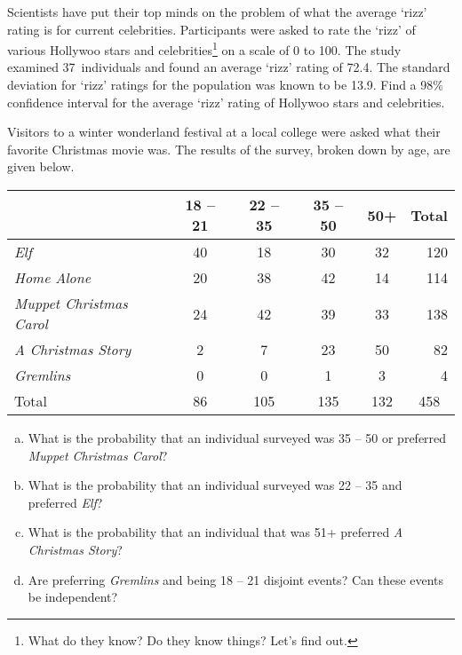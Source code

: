 \documentclass[12pt,letterpaper]{exam}
\begin{document}
\begin{questions}
\newpage
\question[10] Scientists have put their top minds on the problem of what the average `rizz' rating is for current celebrities. Participants were asked to rate the `rizz' of various Hollywoo stars and celebrities\footnote{What do they know? Do they know things? Let's find out.} on a scale of 0 to 100. The study examined 37~individuals and found an average `rizz' rating of 72.4. The standard deviation for `rizz' ratings for the population was known to be 13.9. Find a 98\% confidence interval for the average `rizz' rating of Hollywoo stars and celebrities.



\newpage
\question[10] Visitors to a winter wonderland festival at a local college were asked what their favorite Christmas movie was. The results of the survey, broken down by age, are given below. \par
	\begin{table}[H]
	\centering
	\begin{tabular}{|l|cccc|r|} \hline
	 & 18 -- 21 & 22 -- 35 & 35 -- 50 & 50+ & \multicolumn{1}{c|}{Total} \\ \hline
	\textit{Elf} & 40 & 18 & 30 & 32 & 120 \\
	\textit{Home Alone} & 20 & 38 & 42 & 14 & 114 \\
	\textit{Muppet Christmas Carol} & 24 & 42 & 39 & 33 & 138 \\
	\textit{A Christmas Story} & 2 & 7 & 23 & 50 & 82 \\
	\textit{Gremlins} & 0 & 0 & 1 & 3 & 4 \\ \hline
	Total & 86 & 105 & 135 & 132 & \multicolumn{1}{c|}{458} \\ \hline
	\end{tabular}
	\end{table} \par

\begin{enumerate}[(a)]
\item What is the probability that an individual surveyed was 35 -- 50 or preferred \textit{Muppet Christmas Carol}?
\item What is the probability that an individual surveyed was 22 -- 35 and preferred \textit{Elf}?
\item What is the probability that an individual that was 51+ preferred \textit{A Christmas Story}?
\item Are preferring \textit{Gremlins} and being 18 -- 21 disjoint events? Can these events be independent? 
\end{enumerate}


\end{questions}
\end{document}
